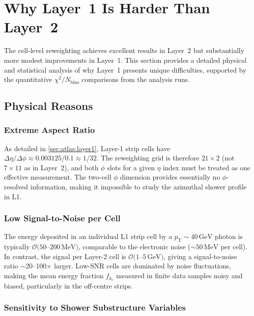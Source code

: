 \documentclass[11pt,a4paper]{article}
\newcommand{\chisq}{\chi^2/N_\mathrm{bins}}
\newcommand{\pt}{p_{\mathrm{T}}}
\begin{document}
\section{Why Layer~1 Is Harder Than Layer~2}
\label{sec:layer1}

The cell-level reweighting achieves excellent results in Layer~2 but
substantially more modest improvements in Layer~1.  This section
provides a detailed physical and statistical analysis of why
Layer~1 presents unique difficulties, supported by the quantitative
$\chisq$ comparisons from the analysis runs.

\subsection{Physical Reasons}
\label{sec:layer1:physical}

\subsubsection{Extreme Aspect Ratio}

As detailed in \cref{sec:atlas:layer1}, Layer-1 strip cells have
$\Delta\eta / \Delta\phi \approx 0.003125 / 0.1 \approx 1/32$.
The reweighting grid is therefore $21 \times 2$ (not $7 \times 11$
as in Layer~2), and both $\phi$ slots for a given $\eta$ index
must be treated as one effective measurement.  The two-cell $\phi$
dimension provides essentially no $\phi$-resolved information,
making it impossible to study the azimuthal shower profile in L1.

\subsubsection{Low Signal-to-Noise per Cell}

The energy deposited in an individual L1 strip cell by a
$\pt \sim 40\,\mathrm{GeV}$ photon is typically
$\mathcal{O}(50$--$200\,\mathrm{MeV})$, comparable to the
electronic noise ($\sim$$50\,\mathrm{MeV}$ per cell).  In contrast,
the signal per Layer-2 cell is $\mathcal{O}(1$--$5\,\mathrm{GeV})$,
giving a signal-to-noise ratio $\sim$20--100$\times$ larger.
Low-SNR cells are dominated by noise fluctuations, making the
mean energy fraction $f_{k_r}$ measured in finite data samples noisy
and biased, particularly in the off-centre strips.

\subsubsection{Sensitivity to Shower Substructure Variables}
\end{document}
